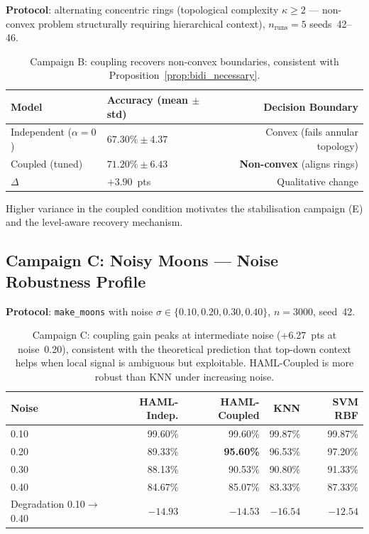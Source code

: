 \documentclass[11pt,a4paper]{article}
\begin{document}
\textbf{Protocol}: alternating concentric rings (topological complexity $\kappa \ge 2$ ---
non-convex problem structurally requiring hierarchical context),
$n_{\mathrm{runs}}=5$ seeds~42--46.

\begin{table}[h]
\centering
\begin{tabular}{llr}
\toprule
\textbf{Model} & \textbf{Accuracy (mean $\pm$ std)} & \textbf{Decision Boundary} \\
\midrule
Independent ($\alpha=0$)    & $67.30\% \pm 4.37$ & Convex (fails annular topology) \\
Coupled (tuned)             & $71.20\% \pm 6.43$ & \textbf{Non-convex} (aligns rings) \\
\midrule
$\Delta$ & $+3.90$~pts & Qualitative change \\
\bottomrule
\end{tabular}
\caption{Campaign B: coupling recovers non-convex boundaries, consistent with Proposition~\ref{prop:bidi_necessary}.}
\label{tab:campaign_b}
\end{table}

Higher variance in the coupled condition motivates the stabilisation campaign (E) and the
level-aware recovery mechanism.

\subsection{Campaign C: Noisy Moons --- Noise Robustness Profile}

\textbf{Protocol}: \texttt{make\_moons} with noise $\sigma \in \{0.10, 0.20, 0.30, 0.40\}$,
$n=3000$, seed~42.

\begin{table}[h]
\centering
\begin{tabular}{lrrrr}
\toprule
\textbf{Noise} & \textbf{HAML-Indep.} & \textbf{HAML-Coupled} & \textbf{KNN} & \textbf{SVM RBF} \\
\midrule
0.10 & 99.60\% & 99.60\%          & 99.87\% & 99.87\% \\
0.20 & 89.33\% & \textbf{95.60\%} & 96.53\% & 97.20\% \\
0.30 & 88.13\% & 90.53\%          & 90.80\% & 91.33\% \\
0.40 & 84.67\% & 85.07\%          & 83.33\% & 87.33\% \\
\midrule
Degradation 0.10$\to$0.40 & $-14.93$ & $-14.53$ & $-16.54$ & $-12.54$ \\
\bottomrule
\end{tabular}
\caption{Campaign C: coupling gain peaks at intermediate noise (+6.27~pts at noise~0.20),
consistent with the theoretical prediction that top-down context helps when local signal is
ambiguous but exploitable.  HAML-Coupled is more robust than KNN under increasing noise.}
\label{tab:campaign_c}
\end{table}
\end{document}
